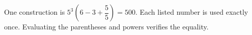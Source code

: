 One construction is $\boxed{5^3(6-3+\dfrac{5}{5})=500}$. Each listed number is used exactly once. Evaluating the parentheses and powers verifies the equality.
